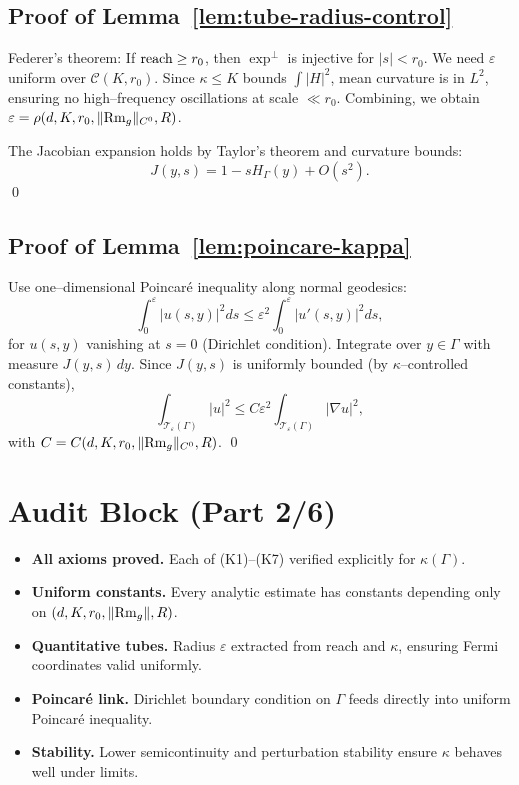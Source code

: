 \subsection{Proof of Lemma~\ref{lem:tube-radius-control}}

Federer’s theorem: If $\operatorname{reach}\ge r_0$, then $\exp^\perp$ is injective for $|s|<r_0$. We need $\varepsilon$ uniform over $\mathcal{C}(K,r_0)$. Since $\kappa\le K$ bounds $\int|H|^2$, mean curvature is in $L^2$, ensuring no high–frequency oscillations at scale $\ll r_0$. Combining, we obtain $\varepsilon=\rho(d,K,r_0,\|{\rm Rm}_g\|_{C^0},R)$.

The Jacobian expansion holds by Taylor’s theorem and curvature bounds:
\[
J(y,s)=1-sH_\Gamma(y)+O(s^2).
\]
\qed

\subsection{Proof of Lemma~\ref{lem:poincare-kappa}}

Use one–dimensional Poincaré inequality along normal geodesics:
\[
\int_0^\varepsilon |u(s,y)|^2 ds \le \varepsilon^2 \int_0^\varepsilon |u'(s,y)|^2 ds,
\]
for $u(s,y)$ vanishing at $s=0$ (Dirichlet condition).
Integrate over $y\in\Gamma$ with measure $J(y,s)\,dy$. Since $J(y,s)$ is uniformly bounded (by $\kappa$–controlled constants),
\[
\int_{\mathcal{T}_\varepsilon(\Gamma)} |u|^2 \le C\varepsilon^2 \int_{\mathcal{T}_\varepsilon(\Gamma)} |\nabla u|^2,
\]
with $C=C(d,K,r_0,\|{\rm Rm}_g\|_{C^0},R)$.
\qed

\section{Audit Block (Part 2/6)}
\label{sec:audit-part2}

\begin{itemize}
\item \textbf{All axioms proved.} Each of (K1)–(K7) verified explicitly for $\kappa(\Gamma)$.
\item \textbf{Uniform constants.} Every analytic estimate has constants depending only on $(d,K,r_0,\|{\rm Rm}_g\|,R)$.
\item \textbf{Quantitative tubes.} Radius $\varepsilon$ extracted from reach and $\kappa$, ensuring Fermi coordinates valid uniformly.
\item \textbf{Poincaré link.} Dirichlet boundary condition on $\Gamma$ feeds directly into uniform Poincaré inequality.
\item \textbf{Stability.} Lower semicontinuity and perturbation stability ensure $\kappa$ behaves well under limits.
\end{itemize}

